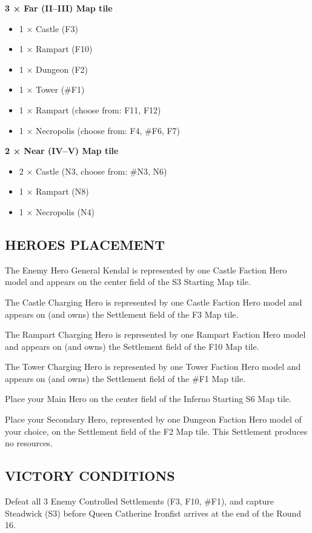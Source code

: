 \begin{multicols*}{2}
\textbf{3 × Far (II--III) Map tile}
\begin{itemize}
  \item 1 × Castle (F3)
  \item 1 × Rampart (F10)
  \item 1 × Dungeon (F2)
  \item 1 × Tower (\#F1)
  \item 1 × Rampart (choose from: F11, F12)
  \item 1 × Necropolis (choose from: F4, \#F6, F7)
\end{itemize}

\textbf{2 × Near (IV--V) Map tile}
\begin{itemize}
  \item 2 × Castle (N3, choose from: \#N3, N6)
  \item 1 × Rampart (N8)
  \item 1 × Necropolis (N4)
\end{itemize}

\subsection*{\MakeUppercase{Heroes placement}}

The Enemy Hero General Kendal is represented by one Castle Faction Hero
model and appears on the center field of the S3 Starting Map tile.

The Castle Charging Hero is represented by one Castle Faction Hero model
and appears on (and owns) the Settlement field of the F3 Map tile.

The Rampart Charging Hero is represented by one Rampart Faction Hero model
and appears on (and owns) the Settlement field of the F10 Map tile.

The Tower Charging Hero is represented by one Tower Faction Hero model
and appears on (and owns) the Settlement field of the \#F1 Map tile.

Place your Main Hero on the center field of the Inferno Starting S6 Map tile.

Place your Secondary Hero, represented by one Dungeon Faction Hero model of your choice,
on the Settlement field of the F2 Map tile. This Settlement produces no resources.

\subsection*{\MakeUppercase{Victory Conditions}}

Defeat all 3 Enemy Controlled Settlements (F3, F10, \#F1), and capture Steadwick (S3) before
Queen Catherine Ironfist arrives at the end of the Round 16.


\end{multicols*}
